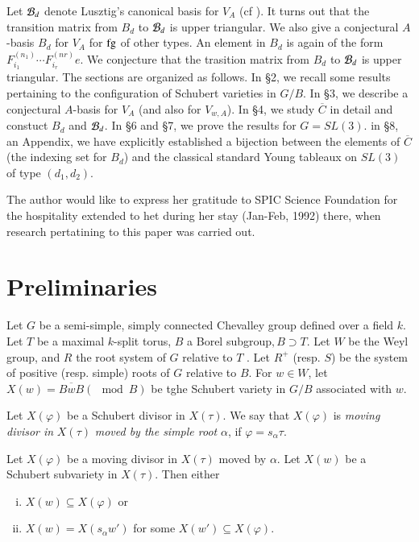 Let $\mathcal{B}_{d}$ denote Lusztig's canonical basis for $V_{A}$ (cf \cite{chap9-keyL2}). It turns out that the transition matrix from $B_{d}$ to $\mathcal{B}_{d}$ is upper triangular. We also give a conjectural $A$-basis $B_{d}$ for $V_{A}$ for $\operatorname{fg}$ of other types. An element in $B_{d}$ is again of the form $F_{i_{1}}^{(n_{1})}\cdots F_{i_{r}}^{(nr)}e$. We conjecture that the trasition matrix from $B_{d}$ to $\mathcal{B}_{d}$ is upper triangular. The sections are organized as follows. In \S2,
we recall some results pertaining to the configuration of Schubert varieties in $G/B$. In \S3, we describe a conjectural $A$-basis  for $V_{A}$ (and also for $V_{w, A}$). In \S4, we study $\overline{C}$ in detail and constuct $B_{d}$ and $\mathcal{B}_{d}$. In \S6 and \S7, we prove the results for $G=SL(3)$. in \S8, an Appendix, we have explicitly established a bijection between the elements of $\overline{C}$ (the indexing set for $B_{d}$) and the classical standard Young tableaux on $SL(3)$ of type $(d_{1}, d_{2})$.

The author would like to express her gratitude to SPIC Science Foundation for the hospitality extended to het during her stay (Jan-Feb, 1992) there, when research pertatining to this paper was carried out.

\section{Preliminaries}\label{chap9-sec-2}
\pageoriginale

Let $G$ be a semi-simple, simply connected Chevalley group defined over a field $k$. Let $T$ be a maximal $k$-split torus, $B$ a Borel subgroup$, B\supset T$. Let $W$ be the Weyl group, and $R$ the root system of $G$ relative to $T$ . Let $R^{+}$ (resp. $S$) be the system of positive (resp. simple) roots of $G$ relative to $B$. For $w \in W$, let $X(w) = \overline{BwB}(\mod B)$ be tghe Schubert variety in $G/B$ associated with $w$.

\begin{definition}\label{chap9-definition-2.1}
Let $X(\varphi)$ be a Schubert divisor in $X(\tau)$. We say that $X(\varphi)$ is \textit{moving divisor in} $X(\tau)$ \textit{moved by the simple root} $\alpha$, if $\varphi=s_{\alpha} \tau$.
\end{definition}

\begin{seclem}\label{chap9-lemma-2.2}
Let $X(\varphi)$ be a moving divisor in $X(\tau)$ moved by $\alpha$. Let $X(w)$ be a Schubert subvariety in $X(\tau)$. Then either
\begin{enumerate}[(i)]
\item $X(w) \subseteq X(\varphi)$ or\label{chap9-lemma2.2-enum-1}
\item $X(w) = X(s_{\alpha}w')$ for some $X(w') \subseteq X(\varphi)$.\label{chap9-lemma2.2-enum-2}
\end{enumerate}
\end{seclem}

